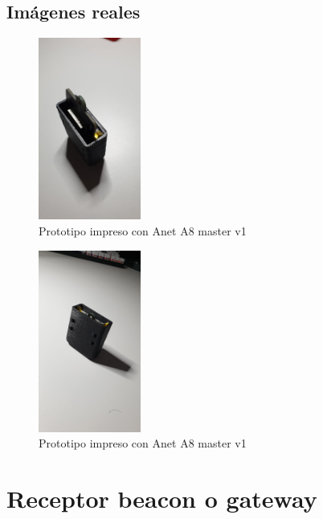 \documentclass[a4paper ,12pt, onecolumn]{article}
\begin{document}
    \subsection{Imágenes reales}

        \begin{center}
            \begin{figure}[h]
                \centering
                \includegraphics[width=0.3\textwidth]{../3d_beacon_1.jpeg}
                \caption{Prototipo impreso con Anet A8 master v1}
                \label{fig:mesh1}
            \end{figure}
        \end{center}
        \begin{center}
            \begin{figure}[h]
                \centering
                \includegraphics[width=0.3\textwidth]{../3d_beacon_2.jpeg}
                \caption{Prototipo impreso con Anet A8 master v1}
                \label{fig:mesh1}
            \end{figure}
        \end{center}

\section{Receptor beacon o gateway}
\end{document}
